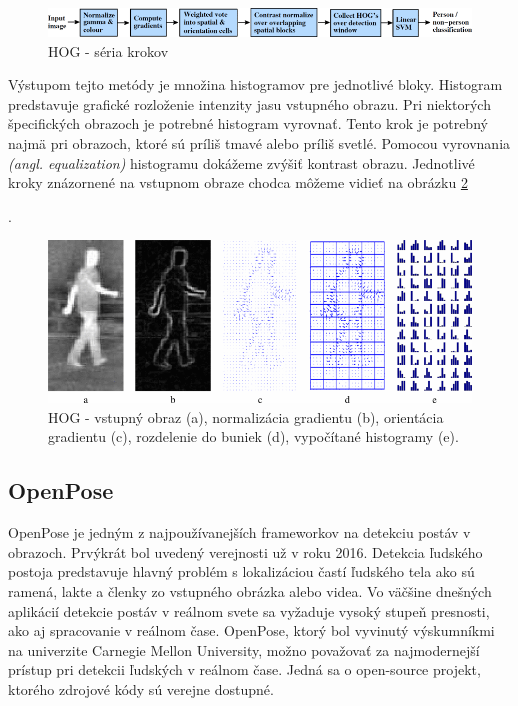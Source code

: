 \documentclass[slovak,master,dept460,male,cpp,cpdeclaration]{diploma}
\begin{document}
\begin{figure}[H]
	\centering
	\includegraphics[width=1\textwidth]{Figures/hog.png}
	\caption{HOG - séria krokov \cite{dalal2005}}
	\label{fig:HOG1}
\end{figure}

Výstupom tejto metódy je množina histogramov pre jednotlivé bloky. Histogram predstavuje grafické rozloženie intenzity jasu vstupného obrazu. Pri niektorých špecifických obrazoch je potrebné histogram vyrovnať. Tento krok je potrebný najmä pri obrazoch, ktoré sú príliš tmavé alebo príliš svetlé. Pomocou vyrovnania \textit{(angl. equalization)} histogramu  dokážeme zvýšiť kontrast obrazu. Jednotlivé kroky znázornené na vstupnom obraze chodca môžeme vidieť na obrázku \ref{fig:HOG2}\par.


\begin{figure}[H]
	\centering
	\includegraphics[width=1\textwidth]{Figures/hog3.png}
	\caption{HOG - vstupný obraz (a), normalizácia gradientu (b), orientácia gradientu (c), rozdelenie do buniek (d), vypočítané histogramy (e). \cite{bertozzi2007pedestrian}}
	\label{fig:HOG2}
\end{figure}


\newpage
\subsection{OpenPose}
OpenPose\cite{cao2018openpose} je jedným z najpoužívanejších frameworkov na detekciu postáv v obrazoch. Prvýkrát bol uvedený verejnosti už v roku 2016. Detekcia ľudského postoja predstavuje hlavný problém s lokalizáciou častí ľudského tela ako sú ramená, lakte a členky zo vstupného obrázka alebo videa. Vo väčšine dnešných aplikácií detekcie postáv v reálnom svete sa vyžaduje vysoký stupeň presnosti, ako aj spracovanie v reálnom čase.
OpenPose, ktorý bol vyvinutý výskumníkmi na univerzite Carnegie Mellon University, možno považovať za najmodernejší prístup pri detekcii ľudských v reálnom čase. Jedná sa o open-source projekt, ktorého zdrojové kódy sú verejne dostupné\cite{githubOpenpose}.
\end{document}
